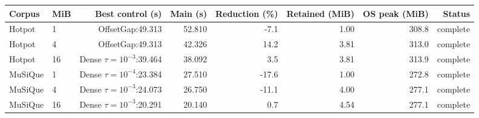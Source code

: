 \begin{tabular}{llrrrrrr}\toprule
Corpus & MiB & Best control (s) & Main (s) & Reduction (\%) & Retained (MiB) & OS peak (MiB) & Status \\
\midrule
Hotpot & 1 & OffsetGap:49.313 & 52.810 & -7.1 & 1.00 & 308.8 & complete \\
Hotpot & 4 & OffsetGap:49.313 & 42.326 & 14.2 & 3.81 & 313.0 & complete \\
Hotpot & 16 & Dense $\tau=10^{-3}$:39.464 & 38.092 & 3.5 & 3.81 & 313.9 & complete \\
MuSiQue & 1 & Dense $\tau=10^{-4}$:23.384 & 27.510 & -17.6 & 1.00 & 272.8 & complete \\
MuSiQue & 4 & Dense $\tau=10^{-3}$:24.073 & 26.750 & -11.1 & 4.00 & 277.1 & complete \\
MuSiQue & 16 & Dense $\tau=10^{-3}$:20.291 & 20.140 & 0.7 & 4.54 & 277.1 & complete \\
\bottomrule\end{tabular}

